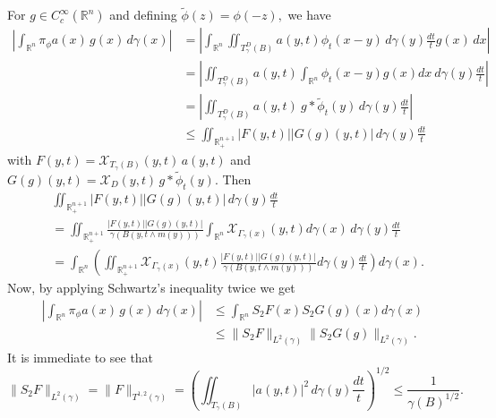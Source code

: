\documentclass[leqno,11pt]{amsart}
\theoremstyle{plain}
\theoremstyle{remark}
\begin{document}
{{\begin{itemize}
\begin{itemize}
For $g\in C_c^\infty ({\mathbb R}^n)$ and defining $\widetilde{\phi}(z)=\phi(-z),$ we have
\begin{align*}
\left|\int_{{\mathbb R}^n}\pi_\phi a (x)\, g(x)\, d\gamma(x)\right|&= \left|\int_{{\mathbb R}^n}\iint_{T^D_\gamma(B)}  a(y,t) \phi_{t} (x-y)\, d\gamma(y)\frac{dt}{t}g(x)\, dx\right|\\ & =\left| \iint_{T^D_\gamma(B)}a(y,t) \int_{{\mathbb R}^n}\phi_{t}(x-y)g(x)dx\ d\gamma(y)\frac{dt}{t}\right|\\ &= \left|\iint_{T^D_\gamma(B)} a(y,t)\  g\ast \widetilde{\phi}_{t}(y)\, d\gamma(y)\frac{dt}{t}\right|\\ &\le \iint_{{\mathbb R}^{n+1}_+} |F(y,t)|| G(g)(y,t)|\, d\gamma(y)\frac{dt}{t}
\end{align*}
with $F(y,t)=\mathcal{X}_{T_\gamma(B)}(y,t)\,  a(y,t)$ and $G(g)(y,t)=\mathcal{X}_{D}(y,t)\, g\ast \widetilde{\phi}_{t}(y). $ Then
\begin{align*}
& \iint_{{\mathbb R}^{n+1}_+}   |F(y,t)| |G(g)(y,t)|\, d\gamma(y)\frac{dt}{t}
\\ &= \iint_{{\mathbb R}^{n+1}_+}\frac{|F(y,t)|  {|G(g)(y,t)|}  }{\gamma (B(y,t\wedge m(y)))}  \int_{{\mathbb R}^n}\mathcal{X}_{\Gamma_\gamma(x)}(y,t) d\gamma(x)\, d\gamma(y)\frac{dt}{t}\\ 
& = \int_{{\mathbb R}^n}\left( \iint_{{\mathbb R}^{n+1}_+}\mathcal{X}_{\Gamma_\gamma(x)} (y,t)\frac{|F(y,t)||G(g)(y,t)|}{\gamma (B(y,t\wedge m(y)))}\right.  \left.    d\gamma(y)\frac{dt}{t}\right) d\gamma (x).
\end{align*}
Now, by applying Schwartz's inequality twice we get 
\begin{align*}
\left|\int_{{\mathbb R}^n}\pi_\phi a (x)\, g(x)\, d\gamma(x)\right|& \le \int_{{\mathbb R}^n}S_{2}F(x)S_{2}G(g)(x) d\gamma(x)\\ &\le \|S_{2}F\|_{L^2(\gamma)}\|S_{2}G(g)\|_{L^2(\gamma)}.
\end{align*}
It is immediate to see that $$\|S_{2}F\|_{L^2(\gamma)}= \|F\|_{T^{1,2}(\gamma)}=\left(\iint_{T_\gamma (B)}|a(y,t)|^2\, d\gamma(y)\frac{dt}{t}\right)^{1/2}\le \frac{1}{\gamma(B)^{1/2}}.$$


\end{itemize}
\end{itemize}}}
\end{document}

